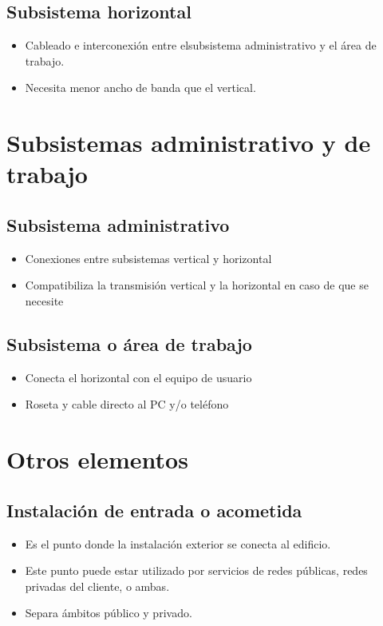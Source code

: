\documentclass[11pt]{article}
\begin{document}
\subsection{Subsistema horizontal}
\label{sec:org86bc51e}
\begin{itemize}
\item Cableado e interconexión entre elsubsistema administrativo y el área de trabajo.
\item Necesita menor ancho de banda que el vertical.
\end{itemize}

\section{Subsistemas administrativo y de trabajo}
\label{sec:org64edf50}
\subsection{Subsistema administrativo}
\label{sec:orge659e67}
\begin{itemize}
\item Conexiones entre subsistemas vertical y horizontal
\item Compatibiliza la transmisión vertical y la horizontal en caso de que se necesite
\end{itemize}
\subsection{Subsistema o área de trabajo}
\label{sec:org48b8223}
\begin{itemize}
\item Conecta el horizontal con el equipo de usuario
\item Roseta y cable directo al PC y/o teléfono
\end{itemize}

\section{Otros elementos}
\label{sec:org38f8c7e}
\subsection{Instalación de entrada o acometida}
\label{sec:orgd8eac87}
\begin{itemize}
\item Es el punto donde la instalación exterior se conecta al edificio.
\item Este punto puede estar utilizado por servicios de redes públicas, redes privadas del cliente, o ambas.
\item Separa ámbitos público y privado.
\end{itemize}
\end{document}
